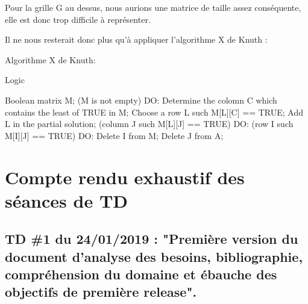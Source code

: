 \documentclass[1]{report}
\begin{document}
    Pour la grille G au dessus, nous aurions une matrice de taille assez conséquente, elle est donc trop difficile à représenter. \newline
    
    Il ne nous resterait donc plus qu'à appliquer l'algorithme X de Knuth : \newline
    
    Algorithme X de Knuth:
    \begin{algorithm}[H]
\caption{Logic}
\begin{algorithmic}[1]

    
    Boolean matrix M;
    \WHILE (M is not empty) DO:
    	Determine the colomn C which contains the least of TRUE in M;
        Choose a row L such M[L][C] == TRUE;
        Add L in the partial solution;
        \FOR (column J such M[L][J] == TRUE) DO:
            \FOR (row I such M[I][J] == TRUE) DO:
                Delete I from M;
            \ENDFOR
            Delete J from A;
        \ENDFOR
    \ENDWHILE
    
    

\end{algorithmic}
\end{algorithm}

\chapter{Compte rendu exhaustif des séances de TD}

    \section{TD \#1 du 24/01/2019 : "Première version du document d'analyse des besoins, bibliographie, compréhension du domaine et ébauche des objectifs de première release".}
\end{document}
